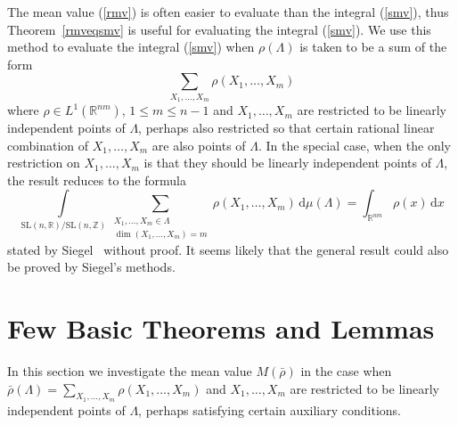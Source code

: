 \documentclass[11pt]{article}
\theoremstyle{definition}
\theoremstyle{proof}
\begin{document}
The mean value (\ref{rmv}) is often easier to evaluate than the integral (\ref{smv}), thus Theorem~\ref{rmveqsmv} is useful for evaluating the integral (\ref{smv}).
We use this method to evaluate the integral (\ref{smv}) when $\rho (\Lambda )$ is taken to be a sum of the form
\[
    \sum_{X_1, \ldots, X_m} \rho (X_1, \ldots, X_m) 
\]
where $\rho \in L^1(\mathbb{R}^{nm})$, $1\leq  m \leq n-1$ and $X_1, \ldots, X_m$ are restricted to be linearly independent points of $\Lambda$, perhaps also restricted so that certain rational linear combination of $X_1, \ldots, X_m$ are also points of $\Lambda$.
In the special case, when the only restriction on $X_1, \ldots, X_m$ is that they should be linearly independent points of $\Lambda$, the result reduces to the formula
\[
    \int\limits_{\mathrm{SL}(n,\mathbb{R})/\mathrm{SL}(n,\mathbb{Z})} \sum_{\substack{X_1, \ldots, X_m \in \Lambda \\ \dim (X_1, \ldots, X_m) = m}} \rho (X_1, \ldots, X_m) \, \mathrm{d} \mu (\Lambda ) = \int_{\mathbb{R}^{nm}} \rho (x) \, \mathrm{d} x
\]
stated by Siegel~\cite{siegel45} without proof.
It seems likely that the general result could also be proved by Siegel's methods.

\section{Few Basic Theorems and Lemmas}
In this section we investigate the mean value $M(\bar{\rho })$ in the case when $\bar{\rho} (\Lambda ) = \displaystyle\sum_{X_1, \ldots, X_m} \rho (X_1, \ldots, X_m)$ and $X_1, \ldots, X_m$ are restricted to be linearly independent points of $\Lambda$, perhaps satisfying certain auxiliary conditions.
\end{document}
